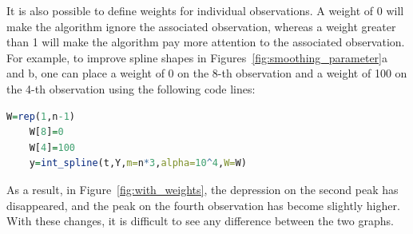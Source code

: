 \documentclass[a4paper,10pt]{article}
\begin{document}
It is also possible to define weights for individual observations.
A weight of 0 will make the algorithm ignore the associated observation, whereas a weight greater than 1 will make the algorithm pay more attention to the associated observation.
For example, to improve spline shapes in Figures~\ref{fig:smoothing_parameter}a and b, one can place a weight of 0 on the 8-th observation and a weight of 100 on the 4-th observation using the following code lines: 

\begin{lstlisting}[language=R]
	W=rep(1,n-1)
	W[8]=0
	W[4]=100
	y=int_spline(t,Y,m=n*3,alpha=10^4,W=W)
\end{lstlisting} 

As a result, in Figure~\ref{fig:with_weights}, the depression on the second peak has disappeared, and the peak on the fourth observation has become slightly higher.
With these changes, it is difficult to see any difference between the two graphs. 
\end{document}
